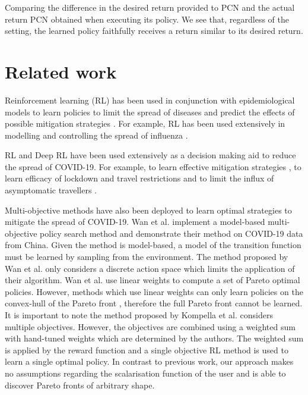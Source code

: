 \documentclass{article}
\renewcommand{\cite}[1]{\citep{#1}}
\begin{document}
\begin{table}[t]
    \centering
    \setlength{\tabcolsep}{0.5em} %
    {\renewcommand{\arraystretch}{1.2}%
    
    }
    \caption{Comparing the difference in the desired return provided to PCN and the actual return PCN obtained when executing its policy. We see that, regardless of the setting, the learned policy faithfully receives a return similar to its desired return.}
    \label{tab:pcn-robustness}
\end{table}

\section{Related work}
Reinforcement learning (RL) has been used in conjunction with epidemiological models to learn policies to limit the spread of diseases and predict the effects of possible mitigation strategies \cite{probert2019context,ernst2006clinical}. For example, RL has been used extensively in modelling and controlling the spread of influenza \cite{das2008large,libin2020,libin2018bayesian}.
 
RL and Deep RL have been used extensively as a decision making aid to reduce the spread of COVID-19. For example, to learn effective mitigation strategies \cite{ohi2020exploring}, to learn efficacy of lockdown and travel restrictions \cite{kwak2021covid} and to limit the influx of asymptomatic travellers \cite{bastani2021efficient}.

Multi-objective methods have also been deployed to learn optimal strategies to mitigate the spread of COVID-19. Wan et al. \cite{wan2021multi} implement a model-based multi-objective policy search method and demonstrate their method on COVID-19 data from China. Given the method is model-based, a model of the transition function must be learned by sampling from the environment. The method proposed by Wan et al. \cite{wan2021multi} only considers a discrete action space which limits the application of their algorithm. Wan et al. \cite{wan2021multi} use linear weights to compute a set of Pareto optimal policies. However, methods which use linear weights can only learn policies on the convex-hull of the Pareto front \cite{vamplew2008limitations}, therefore the full Pareto front cannot be learned. It is important to note the method proposed by Kompella et al. \cite{kompella2020reinforcement} considers multiple objectives. However, the objectives are combined using a weighted sum with hand-tuned weights which are determined by the authors. The weighted sum is applied by the reward function and a single objective RL method is used to learn a single optimal policy.
In contrast to previous work, our approach makes no assumptions regarding the scalarisation function of the user and is able to discover Pareto fronts of arbitrary shape.
\end{document}
